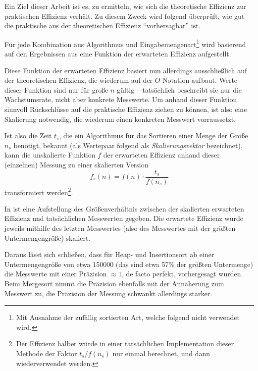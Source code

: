 Ein Ziel dieser Arbeit ist es, zu ermitteln, wie sich die theoretische Effizienz zur praktischen Effizienz verhält. Zu diesem Zweck wird folgend überprüft, wie gut die praktische aus der theoretischen Effizienz \enquote{vorhersagbar} ist.

Für jede Kombination aus Algorithmus und Eingabemengenart\footnote{Mit Ausnahme der zufällig sortierten Art, welche folgend nicht verwendet wird.} wird basierend auf den Ergebnissen aus  eine Funktion der erwarteten Effizienz aufgestellt.

Diese Funktion der erwarteten Effizienz basiert nun allerdings ausschließlich auf der theoretischen Effizienz, die wiederum auf der $O$-Notation aufbaut. Werte dieser Funktion sind nur für große $n$ gültig -- tatsächlich beschreibt sie nur die Wachstumsrate, nicht aber konkrete Messwerte. Um anhand dieser Funktion sinnvoll Rückschlüsse auf die praktische Effizienz ziehen zu können, ist also eine Skalierung notwendig, die wiederum einen konkreten Messwert vorraussetzt.

Ist also die Zeit $t_s$, die ein Algorithmus für das Sortieren einer Menge der Größe $n_s$ benötigt, bekannt (als Wertepaar folgend als \emph{Skalierungsvektor} bezeichnet), kann die unskalierte Funktion $f$ der erwarteten Effizienz anhand dieser (einzelnen) Messung zu einer skalierten Version
\begin{equation*}
    f_s(n) = f(n) \cdot \frac{t_s}{f(n_s)}
\end{equation*}
transformiert werden\footnote{Der Effizienz halber würde in einer tatsächlichen Implementation dieser Methode der Faktor $t_s / f(n_s)$ nur einmal berechnet, und dann wiederverwendet werden.}.



In  ist eine Aufstellung des Größenverhältnis zwischen der skalierten erwarteten Effizienz und tatsächlichen Messwerten gegeben. Die erwartete Effizienz wurde jeweils mithilfe des letzten Messwertes (also des Messwertes mit der größten Untermengengröße) skaliert.

Daraus lässt sich schließen, dass für Heap- und Insertionsort ab einer Untermengengröße von etwa 150000 (das sind etwa 57\% der größten Untermenge) die Messwerte mit einer Präzision $\approx 1$, de facto perfekt, vorhergesagt wurden. Beim Mergesort nimmt die Präzision ebenfalls mit der Annäherung zum Messwert zu, die Präzision der Messung schwankt allerdings stärker.

